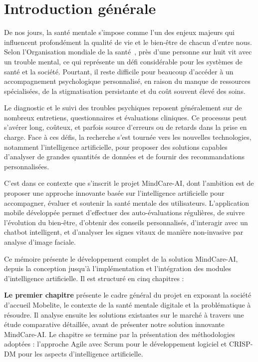 \chapter*{Introduction générale}
\thispagestyle{fancy}

De nos jours, la santé mentale s'impose comme l'un des enjeux majeurs qui influencent profondément la qualité de vie et le bien-être de chacun d'entre nous. Selon l'Organisation mondiale de la santé~\cite{oms_mental_health}, près d'une personne sur huit vit avec un trouble mental, ce qui représente un défi considérable pour les systèmes de santé et la société. Pourtant, il reste difficile pour beaucoup d'accéder à un accompagnement psychologique personnalisé, en raison du manque de ressources spécialisées, de la stigmatisation persistante et du coût souvent élevé des soins.

Le diagnostic et le suivi des troubles psychiques reposent généralement sur de nombreux entretiens, questionnaires et évaluations cliniques. Ce processus peut s'avérer long, coûteux, et parfois source d'erreurs ou de retards dans la prise en charge. Face à ces défis, la recherche s'est tournée vers les nouvelles technologies, notamment l'intelligence artificielle, pour proposer des solutions capables d'analyser de grandes quantités de données et de fournir des recommandations personnalisées.

C'est dans ce contexte que s'inscrit le projet MindCare-AI, dont l'ambition est de proposer une approche innovante basée sur l'intelligence artificielle pour accompagner, évaluer et soutenir la santé mentale des utilisateurs. L'application mobile développée permet d'effectuer des auto-évaluations régulières, de suivre l'évolution du bien-être, d'obtenir des conseils personnalisés, d'interagir avec un chatbot intelligent, et d'analyser les signes vitaux de manière non-invasive par analyse d'image faciale.

Ce mémoire présente le développement complet de la solution MindCare-AI, depuis la conception jusqu'à l'implémentation et l'intégration des modules d'intelligence artificielle. Il est structuré en cinq chapitres :

\textbf{Le premier chapitre} présente le cadre général du projet en exposant la société d'accueil Mobelite, le contexte de la santé mentale digitale et la problématique à résoudre. Il analyse ensuite les solutions existantes sur le marché  à travers une étude comparative détaillée, avant de présenter notre solution innovante MindCare-AI. Le chapitre se termine par la présentation des méthodologies adoptées : l'approche Agile avec Scrum pour le développement logiciel et CRISP-DM pour les aspects d'intelligence artificielle.

